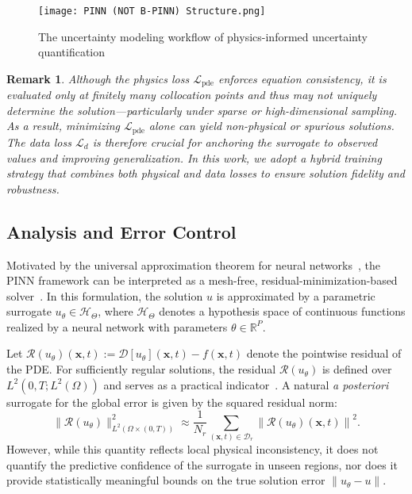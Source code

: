 \documentclass[preprint,12pt]{elsarticle}
\newtheorem{remark}{Remark}[section]
\begin{document}
\begin{figure}[htbp]  %
  \centering
  \texttt{[image: PINN (NOT B-PINN) Structure.png]}
  \caption{The uncertainty modeling workflow of physics-informed uncertainty quantification}
  \label{fig:pinn}
\end{figure}

\begin{remark}
Although the physics loss $\mathcal{L}_{\mathrm{pde}}$ enforces equation consistency, it is evaluated only at finitely many collocation points and thus may not uniquely determine the solution—particularly under sparse or high-dimensional sampling. As a result, minimizing $\mathcal{L}_{\mathrm{pde}}$ alone can yield non-physical or spurious solutions. The data loss $\mathcal{L}_d$ is therefore crucial for anchoring the surrogate to observed values and improving generalization. In this work, we adopt a hybrid training strategy that combines both physical and data losses to ensure solution fidelity and robustness.
\end{remark}


\subsection{Analysis and Error Control}
\label{sec:sub:analysis}

Motivated by the universal approximation theorem for neural networks~\cite{augustine2024survey}, the PINN framework can be interpreted as a mesh-free, residual-minimization-based solver~\cite{raissi_physics-informed_2019, karniadakis2021physics}. In this formulation, the solution $u$ is approximated by a parametric surrogate $u_\theta \in \mathcal{H}_\Theta$, where $\mathcal{H}_\Theta$ denotes a hypothesis space of continuous functions realized by a neural network with parameters $\theta \in \mathbb{R}^P$. 

Let $\mathcal{R}(u_\theta)(\mathbf{x},t) := \mathcal{D}[u_\theta](\mathbf{x},t) - f(\mathbf{x},t)$ denote the pointwise residual of the PDE. For sufficiently regular solutions, the residual $\mathcal{R}(u_\theta)$ is defined over $L^2(0,T; L^2(\Omega))$ and serves as a practical indicator~\cite{mao2023physics}. A natural {\it a posteriori} surrogate for the global error is given by the squared residual norm:
\[
\| \mathcal{R}(u_\theta) \|_{L^2(\Omega \times (0,T))}^2 
\approx \frac{1}{N_r} \sum_{(\mathbf{x},t) \in \mathcal{D}_r} \left\| \mathcal{R}(u_\theta)(\mathbf{x},t) \right\|^2.
\]
However, while this quantity reflects local physical inconsistency, it does not quantify the predictive confidence of the surrogate in unseen regions, nor does it provide statistically meaningful bounds on the true solution error $\|u_\theta - u\|$.
\end{document}
